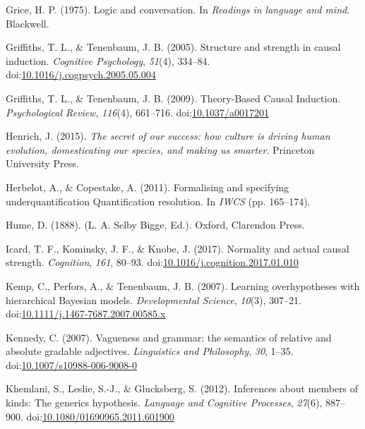 \documentclass[english,,man,floatsintext]{apa6}
\theoremstyle{definition}
\theoremstyle{definition}
\theoremstyle{definition}
\theoremstyle{remark}
\begin{document}
\leavevmode\hypertarget{ref-Grice1975}{}%
Grice, H. P. (1975). Logic and conversation. In \emph{Readings in
language and mind}. Blackwell.

\leavevmode\hypertarget{ref-Griffiths2005}{}%
Griffiths, T. L., \& Tenenbaum, J. B. (2005). Structure and strength in
causal induction. \emph{Cognitive Psychology}, \emph{51}(4), 334--84.
doi:\href{https://doi.org/10.1016/j.cogpsych.2005.05.004}{10.1016/j.cogpsych.2005.05.004}

\leavevmode\hypertarget{ref-Griffiths2009}{}%
Griffiths, T. L., \& Tenenbaum, J. B. (2009). Theory-Based Causal
Induction. \emph{Psychological Review}, \emph{116}(4), 661--716.
doi:\href{https://doi.org/10.1037/a0017201}{10.1037/a0017201}

\leavevmode\hypertarget{ref-Henrich2015}{}%
Henrich, J. (2015). \emph{The secret of our success: how culture is
driving human evolution, domesticating our species, and making us
smarter}. Princeton University Press.

\leavevmode\hypertarget{ref-Herbelot2011}{}%
Herbelot, A., \& Copestake, A. (2011). Formalising and specifying
underquantification Quantification resolution. In \emph{IWCS} (pp.
165--174).

\leavevmode\hypertarget{ref-HumeTHN}{}%
Hume, D. (1888). (L. A. Selby Bigge, Ed.). Oxford, Clarendon Press.

\leavevmode\hypertarget{ref-Icard2017}{}%
Icard, T. F., Kominsky, J. F., \& Knobe, J. (2017). Normality and actual
causal strength. \emph{Cognition}, \emph{161}, 80--93.
doi:\href{https://doi.org/10.1016/j.cognition.2017.01.010}{10.1016/j.cognition.2017.01.010}

\leavevmode\hypertarget{ref-Kemp2007}{}%
Kemp, C., Perfors, A., \& Tenenbaum, J. B. (2007). Learning
overhypotheses with hierarchical Bayesian models. \emph{Developmental
Science}, \emph{10}(3), 307--21.
doi:\href{https://doi.org/10.1111/j.1467-7687.2007.00585.x}{10.1111/j.1467-7687.2007.00585.x}

\leavevmode\hypertarget{ref-Kennedy2007}{}%
Kennedy, C. (2007). Vagueness and grammar: the semantics of relative and
absolute gradable adjectives. \emph{Linguistics and Philosophy},
\emph{30}, 1--35.
doi:\href{https://doi.org/10.1007/s10988-006-9008-0}{10.1007/s10988-006-9008-0}

\leavevmode\hypertarget{ref-Khemlani2012}{}%
Khemlani, S., Leslie, S.-J., \& Glucksberg, S. (2012). Inferences about
members of kinds: The generics hypothesis. \emph{Language and Cognitive
Processes}, \emph{27}(6), 887--900.
doi:\href{https://doi.org/10.1080/01690965.2011.601900}{10.1080/01690965.2011.601900}
\end{document}
